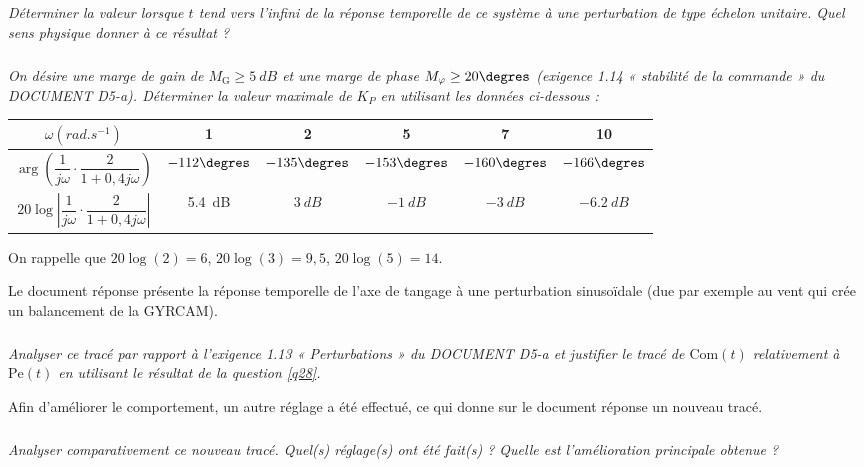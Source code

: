 \documentclass[10pt,fleqn]{article} %
\begin{document}
\subparagraph{\label{q30}}\textit{Déterminer la valeur lorsque $t$ tend vers l’infini de la réponse temporelle de ce système à une perturbation de type échelon unitaire. Quel sens physique donner à ce résultat ?}


\subparagraph{\label{q31}}\textit{On désire une marge de gain de $M_\text{G} \geq \SI{5}{dB}$ et une marge de phase $M_{\varphi}\geq 20\degres$ (exigence 1.14 « stabilité de la commande » du DOCUMENT D5-a). Déterminer la valeur maximale de $K_P$ en utilisant les données ci-dessous :}

\begin{center}
\begin{tabular}{|c|c|c|c|c|c|}
\hline
$\omega (\si{rad.s^{-1}})$ & 1 & 2 & 5 & 7 & 10 \\ \hline
$\arg\left( \dfrac{1}{j\omega} \cdot \dfrac{2}{1+0,4 j\omega}\right)$&  $-112\degres$&$-135\degres$&$-153\degres$&$-160\degres$&$-166\degres$ \\ \hline
$20\log \left| \dfrac{1}{j\omega} \cdot \dfrac{2}{1+0,4 j\omega}\right|$&
\SI{5,4}{dB} & $\SI{3}{dB}$ & $-\SI{1}{dB}$ & $-\SI{3}{dB}$ & $-\SI{6,2}{dB}$ \\ \hline
\end{tabular}
\end{center}

On rappelle que $20\log(2)=6$, $20\log(3)=9,5$, $20\log(5)=14$.

Le document réponse présente la réponse temporelle de l’axe de tangage à une perturbation sinusoïdale (due par exemple au vent qui crée un balancement de la GYRCAM).


\subparagraph{\label{q32}}\textit{Analyser ce tracé par rapport à l’exigence 1.13 « Perturbations » du DOCUMENT D5-a et justifier le tracé de $\text{Com}(t)$ relativement à $\text{Pe}(t)$ en utilisant le résultat de la question \ref{q28}.}

Afin d’améliorer le comportement, un autre réglage a été effectué, ce qui donne sur le document réponse un nouveau tracé. 

\subparagraph{\label{q33}}\textit{Analyser comparativement ce nouveau tracé. Quel(s) réglage(s) ont été fait(s) ? Quelle est l’amélioration principale obtenue ?}










\end{document}

